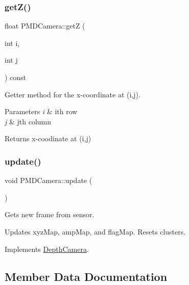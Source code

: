 \subsubsection{\texorpdfstring{get\+Z()}{getZ()}}
{\footnotesize\ttfamily float P\+M\+D\+Camera\+::getZ (\begin{DoxyParamCaption}\item[{int}]{i,  }\item[{int}]{j }\end{DoxyParamCaption}) const\hspace{0.3cm}{\ttfamily [private]}}



Getter method for the x-\/coordinate at (i,j). 


\begin{DoxyParams}{Parameters}
{\em i} & ith row \\
\hline
{\em j} & jth column \\
\hline
\end{DoxyParams}
\begin{DoxyReturn}{Returns}
x-\/coodinate at (i,j) 
\end{DoxyReturn}
\hypertarget{class_p_m_d_camera_aa6cb9398f9635436b4384ee2043def40}{}\label{class_p_m_d_camera_aa6cb9398f9635436b4384ee2043def40} 
\subsubsection{\texorpdfstring{update()}{update()}}
{\footnotesize\ttfamily void P\+M\+D\+Camera\+::update (\begin{DoxyParamCaption}{ }\end{DoxyParamCaption})\hspace{0.3cm}{\ttfamily [virtual]}}



Gets new frame from sensor. 

Updates xyz\+Map, amp\+Map, and flag\+Map. Resets clusters. 

Implements \hyperlink{class_depth_camera_abae1b9f37a00b17f00ff983ebb43ffc5}{Depth\+Camera}.



\subsection{Member Data Documentation}
\hypertarget{class_p_m_d_camera_a315c2931504d25d5b5d882c4b2d9ad26}{}\label{class_p_m_d_camera_a315c2931504d25d5b5d882c4b2d9ad26} 
